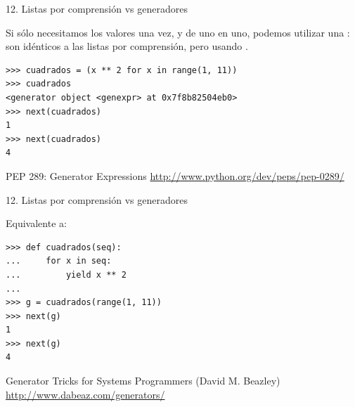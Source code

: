 \documentclass[14pt]{beamer}
\begin{document}
\begin{frame}[fragile]
  {\large 12. Listas por comprensión vs generadores}
  \small
  \begin{block}{}
    \centering
    Si sólo necesitamos los valores una vez, y de uno en uno, podemos
    utilizar una : son idénticos a las
    listas por comprensión, pero usando .
  \end{block}

  \footnotesize
  \begin{exampleblock}{}
    \begin{lstlisting}
>>> cuadrados = (x ** 2 for x in range(1, 11))
>>> cuadrados
<generator object <genexpr> at 0x7f8b82504eb0>
>>> next(cuadrados)
1
>>> next(cuadrados)
4
    \end{lstlisting}
  \end{exampleblock}

  \small
  \begin{block}
    {\centering PEP 289: Generator Expressions}
    \centering \url{http://www.python.org/dev/peps/pep-0289/}
  \end{block}
\end{frame}

\begin{frame}[fragile]
  {\large 12. Listas por comprensión vs generadores}
  \footnotesize
  \begin{exampleblock}
    {Equivalente a:}
    \begin{lstlisting}
>>> def cuadrados(seq):
...     for x in seq:
...         yield x ** 2
...
>>> g = cuadrados(range(1, 11))
>>> next(g)
1
>>> next(g)
4
    \end{lstlisting}
  \end{exampleblock}

  \small
  \begin{block}
    {\centering Generator Tricks for Systems Programmers (David M. Beazley)}
    \centering \url{http://www.dabeaz.com/generators/}
  \end{block}
\end{frame}
\end{document}
